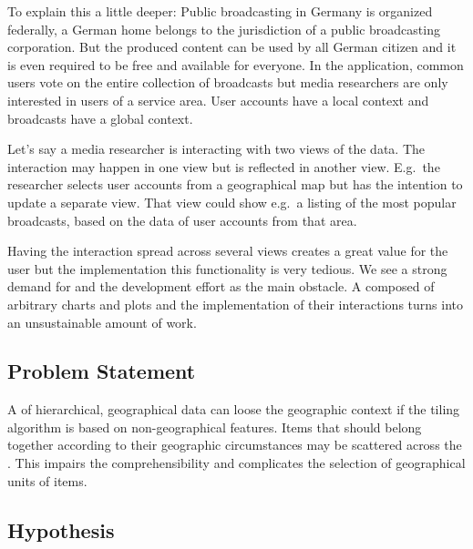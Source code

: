 To explain this a little deeper:
Public broadcasting in Germany is organized federally, a German home belongs to the jurisdiction of a public broadcasting corporation.
But the produced content can be used by all German citizen and it is even required to be free and available for everyone.
In the application, common users vote on the entire collection of broadcasts but media researchers are only interested in users of a service area.
User accounts have a local context and broadcasts have a global context.

Let's say a media researcher is interacting with two views of the data.
The interaction may happen in one view but is reflected in another view.
E.g.\ the researcher selects user accounts from a geographical map but has the intention to update a separate view.
That view could show e.g.\ a listing of the most popular broadcasts, based on the data of user accounts from that area.

Having the interaction spread across several views creates a great value for the user but the implementation this functionality is very tedious.
We see a strong demand for \cmvs{} and the development effort as the main obstacle.
A \cmv{} composed of arbitrary charts and plots and the implementation of their interactions turns into an unsustainable amount of work.

\subsection{Problem Statement}
%

A \tmap{} of hierarchical, geographical data can loose the geographic context if the tiling algorithm is based on non-geographical features.
Items that should belong together according to their geographic circumstances may be scattered across the \tmap{}.
This impairs the comprehensibility and complicates the selection of geographical units of items.

\subsection{Hypothesis}


